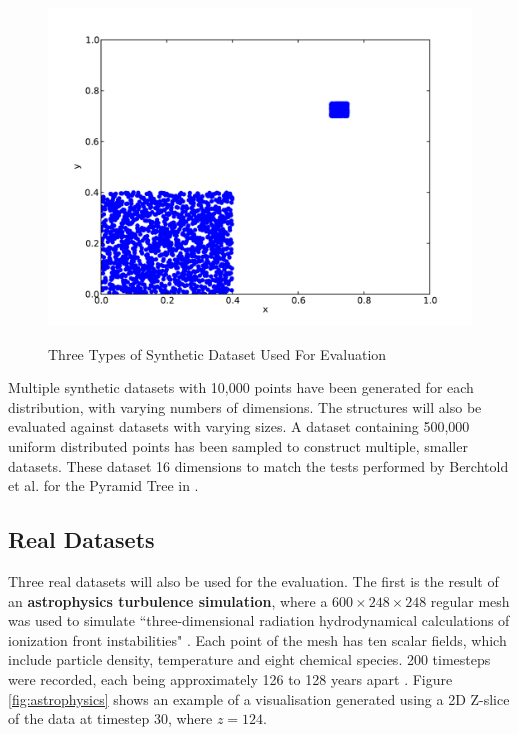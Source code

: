 \begin{figure}
\begin{center}
		\begin{subfloat} {%
			\includegraphics[scale=0.25]{figures/clustered_distribution.pdf}
		}
		\end{subfloat}
	\end{center}

	\caption{Three Types of Synthetic Dataset Used For Evaluation}
	\label{fig:synthetic-data}
\end{figure}

Multiple synthetic datasets with 10,000 points have been generated for each distribution, with varying numbers of dimensions. The structures will also be evaluated against datasets with varying sizes. A dataset containing 500,000 uniform distributed points has been sampled to construct multiple, smaller datasets. These dataset 16 dimensions to match the tests performed by Berchtold et al. for the Pyramid Tree in \cite{pyramid-tree}.


\subsection{Real Datasets}

Three real datasets will also be used for the evaluation. The first is the result of an \textbf{astrophysics turbulence simulation}, where a $600 \times 248 \times 248$ regular mesh was used to simulate ``three-dimensional radiation hydrodynamical calculations of ionization front instabilities" \cite{astrophysics-dataset}.  Each point of the mesh has ten scalar fields, which include particle density, temperature and eight chemical species. 200 timesteps were recorded, each being approximately 126 to 128 years apart \cite{astrophysics-dataset}. Figure \ref{fig:astrophysics} shows an example of a visualisation generated using a 2D Z-slice of the data at timestep 30, where $z = 124$.

